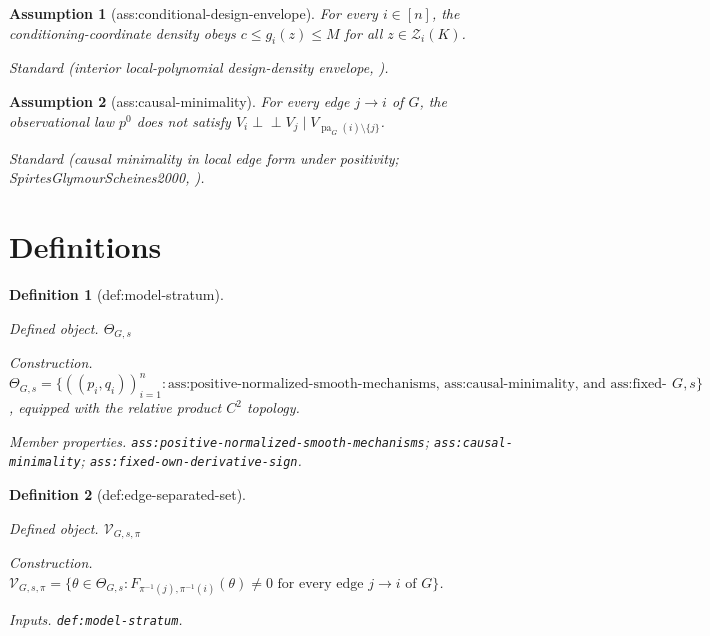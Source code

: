 \documentclass{article}
\newtheorem{assumption}{Assumption}
\newtheorem{definition}{Definition}
\begin{document}
\begin{assumption}[ass:conditional-design-envelope]\label{ass:conditional-design-envelope}
For every \(i\in[n]\), the conditioning-coordinate density obeys \(c\le g_i(z)\le M\) for all \(z\in\mathcal Z_i(K)\).
\par\smallskip\noindent\emph{Standard} (interior local-polynomial design-density envelope, \cite{Xie2023UniformConditionalCDF}).
\end{assumption}

\begin{assumption}[ass:causal-minimality]\label{ass:causal-minimality}
For every edge \(j\to i\) of \(G\), the observational law \(p^0\) does not satisfy \(V_i\mathbin{\perp\!\!\!\perp}V_j\mid V_{\operatorname{pa}_G(i)\setminus\{j\}}\).
\par\smallskip\noindent\emph{Standard} (causal minimality in local edge form under positivity; SpirtesGlymourScheines2000, \cite{SpirtesGlymourScheines2000}).
\end{assumption}

\section{Definitions}

\begin{definition}[def:model-stratum]\label{def:model-stratum}
\par\smallskip\noindent\emph{Defined object.} \(\Theta_{G,s}\)
\par\smallskip\noindent\emph{Construction.} \(\Theta_{G,s}=\{((p_i,q_i))_{i=1}^{n}:\text{ass:positive-normalized-smooth-mechanisms, ass:causal-minimality, and ass:fixed-own-derivative-sign hold for }G,s\}\), equipped with the relative product \(C^2\) topology.
\par\smallskip\noindent\emph{Member properties.} \texttt{ass:\allowbreak{}positive-\allowbreak{}normalized-\allowbreak{}smooth-\allowbreak{}mechanisms}; \texttt{ass:\allowbreak{}causal-\allowbreak{}minimality}; \texttt{ass:\allowbreak{}fixed-\allowbreak{}own-\allowbreak{}derivative-\allowbreak{}sign}.
\end{definition}

\begin{definition}[def:edge-separated-set]\label{def:edge-separated-set}
\par\smallskip\noindent\emph{Defined object.} \(\mathcal V_{G,s,\pi}\)
\par\smallskip\noindent\emph{Construction.} \(\mathcal V_{G,s,\pi}=\{\theta\in\Theta_{G,s}:F_{\pi^{-1}(j),\pi^{-1}(i)}(\theta)\ne0\text{ for every edge }j\to i\text{ of }G\}\).
\par\smallskip\noindent\emph{Inputs.} \texttt{def:\allowbreak{}model-\allowbreak{}stratum}.
\end{definition}
\end{document}
